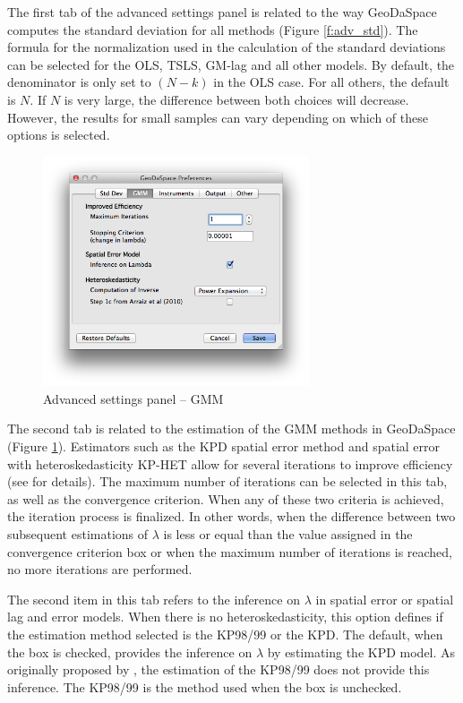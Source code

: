 \documentclass{article}
\begin{document}
The first tab of the advanced settings panel is related to the way GeoDaSpace computes the standard deviation for all methods (Figure \ref{f:adv_std}). The formula for the normalization used in the calculation of the standard deviations can be selected for the OLS, TSLS, GM-lag and all other models. By default, the denominator is only set to $(N-k)$ in the OLS case. For all others, the default is $N$. If $N$ is very large, the difference between both choices will decrease. However, the results for small samples can vary depending on which of these options is selected.
\FloatBarrier

\begin{figure}[htb]
\centering
\includegraphics[width=0.7\textwidth]{adv_gmm.png}
\caption{Advanced settings panel -- GMM}
\label{f:adv_gmm}
\end{figure}

The second tab is related to the estimation of the GMM methods in GeoDaSpace (Figure \ref{f:adv_gmm}). Estimators such as the KPD spatial error method \citep{Drukker10} and spatial error with heteroskedasticity KP-HET \citep{Arraiz10} allow for several iterations to improve efficiency (see \citet{Anselin11} for details). The maximum number of iterations can be selected in this tab, as well as the convergence criterion. When any of these two criteria is achieved, the iteration process is finalized. In other words, when the difference between two subsequent estimations of $\lambda$ is less or equal than the value assigned in the convergence criterion box or when the maximum number of iterations is reached, no more iterations are performed.

The second item in this tab refers to the inference on $\lambda$ in spatial error or spatial lag and error models. When there is no heteroskedasticity, this option defines if the estimation method selected is the KP98/99 or the KPD. The default, when the box is checked, provides the inference on $\lambda$ by estimating the KPD model. As originally proposed by \citet{Kelejian98,Kelejian99}, the estimation of the KP98/99 does not provide this inference. The KP98/99 is the method used when the box is unchecked.
\end{document}
